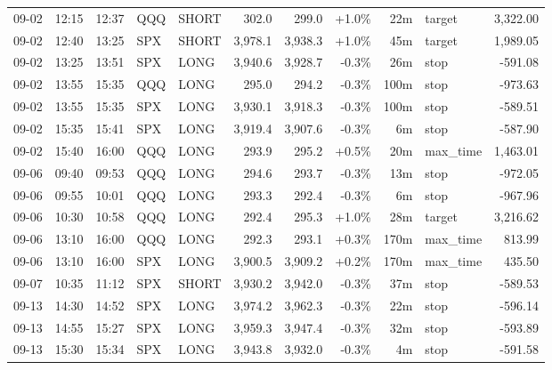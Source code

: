 \documentclass[11pt,a4paper,twoside]{article}
\begin{document}
\begin{center}
\begin{longtable}{>{\color{txtmain}}l l l l l r r r r >{\color{txtmain}}l r}
09-02 & 12:15 & 12:37 & QQQ & SHORT & 302.0 & 299.0 & \textcolor{wingreen}{+1.0\%} & 22m & target & \textcolor{wingreen}{3,322.00} \\
09-02 & 12:40 & 13:25 & SPX & SHORT & 3,978.1 & 3,938.3 & \textcolor{wingreen}{+1.0\%} & 45m & target & \textcolor{wingreen}{1,989.05} \\
09-02 & 13:25 & 13:51 & SPX & LONG & 3,940.6 & 3,928.7 & \textcolor{lossred}{-0.3\%} & 26m & stop & \textcolor{lossred}{-591.08} \\
09-02 & 13:55 & 15:35 & QQQ & LONG & 295.0 & 294.2 & \textcolor{lossred}{-0.3\%} & 100m & stop & \textcolor{lossred}{-973.63} \\
09-02 & 13:55 & 15:35 & SPX & LONG & 3,930.1 & 3,918.3 & \textcolor{lossred}{-0.3\%} & 100m & stop & \textcolor{lossred}{-589.51} \\
09-02 & 15:35 & 15:41 & SPX & LONG & 3,919.4 & 3,907.6 & \textcolor{lossred}{-0.3\%} & 6m & stop & \textcolor{lossred}{-587.90} \\
09-02 & 15:40 & 16:00 & QQQ & LONG & 293.9 & 295.2 & \textcolor{wingreen}{+0.5\%} & 20m & max\_time & \textcolor{wingreen}{1,463.01} \\
09-06 & 09:40 & 09:53 & QQQ & LONG & 294.6 & 293.7 & \textcolor{lossred}{-0.3\%} & 13m & stop & \textcolor{lossred}{-972.05} \\
09-06 & 09:55 & 10:01 & QQQ & LONG & 293.3 & 292.4 & \textcolor{lossred}{-0.3\%} & 6m & stop & \textcolor{lossred}{-967.96} \\
09-06 & 10:30 & 10:58 & QQQ & LONG & 292.4 & 295.3 & \textcolor{wingreen}{+1.0\%} & 28m & target & \textcolor{wingreen}{3,216.62} \\
09-06 & 13:10 & 16:00 & QQQ & LONG & 292.3 & 293.1 & \textcolor{wingreen}{+0.3\%} & 170m & max\_time & \textcolor{wingreen}{813.99} \\
09-06 & 13:10 & 16:00 & SPX & LONG & 3,900.5 & 3,909.2 & \textcolor{wingreen}{+0.2\%} & 170m & max\_time & \textcolor{wingreen}{435.50} \\
09-07 & 10:35 & 11:12 & SPX & SHORT & 3,930.2 & 3,942.0 & \textcolor{lossred}{-0.3\%} & 37m & stop & \textcolor{lossred}{-589.53} \\
09-13 & 14:30 & 14:52 & SPX & LONG & 3,974.2 & 3,962.3 & \textcolor{lossred}{-0.3\%} & 22m & stop & \textcolor{lossred}{-596.14} \\
09-13 & 14:55 & 15:27 & SPX & LONG & 3,959.3 & 3,947.4 & \textcolor{lossred}{-0.3\%} & 32m & stop & \textcolor{lossred}{-593.89} \\
09-13 & 15:30 & 15:34 & SPX & LONG & 3,943.8 & 3,932.0 & \textcolor{lossred}{-0.3\%} & 4m & stop & \textcolor{lossred}{-591.58} \\

\end{longtable}
\end{center}
\end{document}
